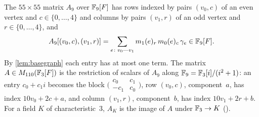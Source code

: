 \begin{definition}\label{def:operator}
The $55\times55$ matrix $A_9$ over $\mathbb{F}_9[F]$ has rows indexed by pairs $(v_0,c)$ of an even vertex and $c\in\{0,\dots,4\}$
and columns by pairs $(v_1,r)$ of an odd vertex and $r\in\{0,\dots,4\}$, and
\[
  A_9[(v_0,c),(v_1,r)]=\sum_{e\colon v_0\text{---}v_1}m_1(e)_r\,m_0(e)_c\,\gamma_e\in\mathbb{F}_9[F].
\]
By \cref{lem:basegraph} each entry has at most one term. The matrix $A\in M_{110}(\mathbb{F}_3[F])$ is the restriction of scalars
of $A_9$ along $\mathbb{F}_9=\mathbb{F}_3[i]/(i^2+1)$: an entry $c_0+c_1i$ becomes the block
$\bigl(\begin{smallmatrix}c_0&c_1\\-c_1&c_0\end{smallmatrix}\bigr)$, row $(v_0,c)$, component~$a$, has index
$10v_0+2c+a$, and column $(v_1,r)$, component~$b$, has index $10v_1+2r+b$. For a field $K$ of characteristic~$3$, $A_K$ is the image of $A$ under $\mathbb{F}_3\to K$ ().
\end{definition}

